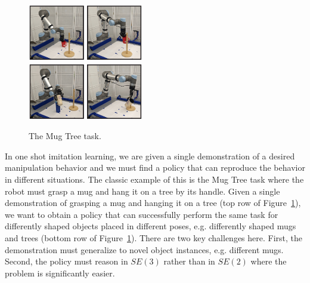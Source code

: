 \documentclass{article}
\begin{document}
\begin{figure}
\vspace{-0.5cm}
  \begin{center}
    \includegraphics[width=0.45\textwidth]{figures/mugs1.png} \\
    \includegraphics[width=0.45\textwidth]{figures/mugs2.png}
    \end{center}
\vspace{-0.2cm}
\caption{The Mug Tree task.}
\label{fig:mugontree}
\end{figure}


In one shot imitation learning, we are given a single demonstration of a desired manipulation behavior and we must find a policy that can reproduce the behavior in different situations. The classic example of this is the Mug Tree task where the robot must grasp a mug and hang it on a tree by its handle. Given a single demonstration of grasping a mug and hanging it on a tree (top row of Figure~\ref{fig:mugontree}), we want to obtain a policy that can successfully perform the same task for differently shaped objects placed in different poses, e.g. differently shaped mugs and trees (bottom row of Figure~\ref{fig:mugontree}). There are two key challenges here. First, the demonstration must generalize to novel object instances, e.g. different mugs. Second, the policy must reason in $SE(3)$ rather than in $SE(2)$ where the problem is significantly easier.

\end{document}
